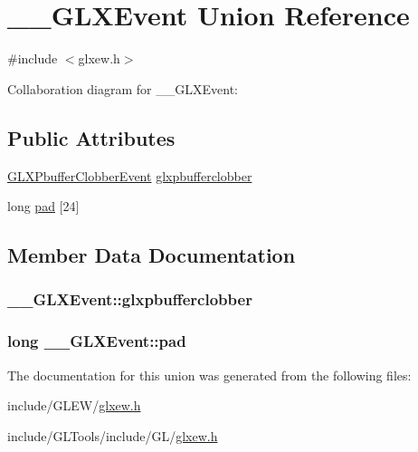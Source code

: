 \hypertarget{union_____g_l_x_event}{\section{\-\_\-\-\_\-\-G\-L\-X\-Event Union Reference}
\label{union_____g_l_x_event}
}


{\ttfamily \#include $<$glxew.\-h$>$}



Collaboration diagram for \-\_\-\-\_\-\-G\-L\-X\-Event\-:
\subsection*{Public Attributes}
\begin{DoxyCompactItemize}
\item 
\hyperlink{struct_g_l_x_pbuffer_clobber_event}{G\-L\-X\-Pbuffer\-Clobber\-Event} \hyperlink{union_____g_l_x_event_ada5880e2b424bcb2f60a411aaf713fae}{glxpbufferclobber}
\item 
long \hyperlink{union_____g_l_x_event_ab9dd153b4b59af2a1fc3b10807f0f481}{pad} \mbox{[}24\mbox{]}
\end{DoxyCompactItemize}


\subsection{Member Data Documentation}
\hypertarget{union_____g_l_x_event_ada5880e2b424bcb2f60a411aaf713fae}{
\subsubsection[{glxpbufferclobber}]{ \-\_\-\-\_\-\-G\-L\-X\-Event\-::glxpbufferclobber}}\label{union_____g_l_x_event_ada5880e2b424bcb2f60a411aaf713fae}
\hypertarget{union_____g_l_x_event_ab9dd153b4b59af2a1fc3b10807f0f481}{
\subsubsection[{pad}]{\setlength{\rightskip}{0pt plus 5cm}long \-\_\-\-\_\-\-G\-L\-X\-Event\-::pad}}\label{union_____g_l_x_event_ab9dd153b4b59af2a1fc3b10807f0f481}


The documentation for this union was generated from the following files\-:\begin{DoxyCompactItemize}
\item 
include/\-G\-L\-E\-W/\hyperlink{_g_l_e_w_2glxew_8h}{glxew.\-h}\item 
include/\-G\-L\-Tools/include/\-G\-L/\hyperlink{_g_l_tools_2include_2_g_l_2glxew_8h}{glxew.\-h}\end{DoxyCompactItemize}
